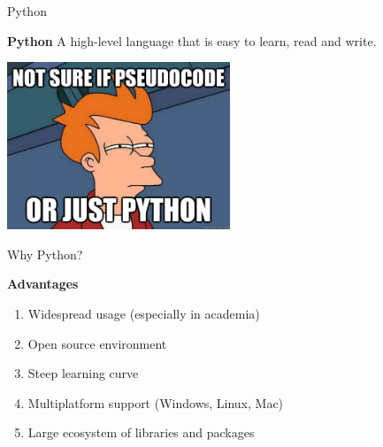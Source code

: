 \begin{frame}{Python}

    \begin{block}{\textbf{Python}}
    A high-level language that is easy to learn, read and write.
    \end{block}

    \begin{center}
	\includegraphics[width=0.5\textwidth]{not_sure_meme.jpg}
    \end{center}

\end{frame}

\begin{frame}{Why Python?}

    \begin{block}{\textbf{Advantages}}
    \begin{enumerate}
        \item Widespread usage (especially in academia)
        \item Open source environment
        \item Steep learning curve
        \item Multiplatform support (Windows, Linux, Mac)
        \item Large ecosystem of libraries and packages
    \end{enumerate}
    \end{block}


\end{frame}

